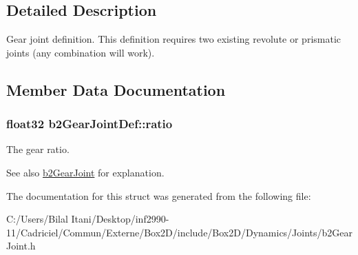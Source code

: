 \subsection{Detailed Description}
Gear joint definition. This definition requires two existing revolute or prismatic joints (any combination will work). 

\subsection{Member Data Documentation}
\subsubsection[{\texorpdfstring{ratio}{ratio}}]{\setlength{\rightskip}{0pt plus 5cm}float32 b2\+Gear\+Joint\+Def\+::ratio}\hypertarget{structb2_gear_joint_def_a57e9f4b6ce1ddc8b89b8455515f69323}{}\label{structb2_gear_joint_def_a57e9f4b6ce1ddc8b89b8455515f69323}
The gear ratio. \begin{DoxySeeAlso}{See also}
\hyperlink{classb2_gear_joint}{b2\+Gear\+Joint} for explanation. 
\end{DoxySeeAlso}


The documentation for this struct was generated from the following file\+:\begin{DoxyCompactItemize}
\item 
C\+:/\+Users/\+Bilal Itani/\+Desktop/inf2990-\/11/\+Cadriciel/\+Commun/\+Externe/\+Box2\+D/include/\+Box2\+D/\+Dynamics/\+Joints/b2\+Gear\+Joint.\+h\end{DoxyCompactItemize}
